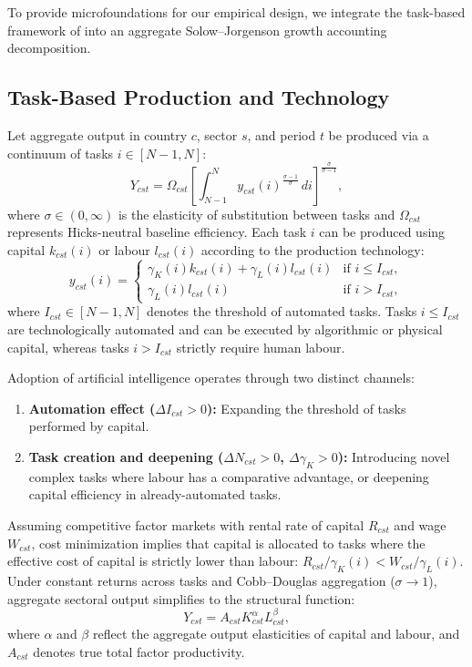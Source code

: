 \documentclass[11pt,a4paper]{article}
\begin{document}
To provide microfoundations for our empirical design, we integrate the task-based framework of \citet{acemoglu2018} into an aggregate Solow--Jorgenson growth accounting decomposition.

\subsection{Task-Based Production and Technology}
Let aggregate output in country $c$, sector $s$, and period $t$ be produced via a continuum of tasks $i \in [N-1, N]$:
\begin{equation}
    Y_{cst} = \Omega_{cst} \left[ \int_{N-1}^{N} y_{cst}(i)^{\frac{\sigma - 1}{\sigma}} \, di \right]^{\frac{\sigma}{\sigma - 1}},
    \label{eq:task_agg}
\end{equation}
where $\sigma \in (0, \infty)$ is the elasticity of substitution between tasks and $\Omega_{cst}$ represents Hicks-neutral baseline efficiency. Each task $i$ can be produced using capital $k_{cst}(i)$ or labour $l_{cst}(i)$ according to the production technology:
\begin{equation}
    y_{cst}(i) = 
    \begin{cases} 
        \gamma_K(i) k_{cst}(i) + \gamma_L(i) l_{cst}(i) & \text{if } i \le I_{cst}, \\
        \gamma_L(i) l_{cst}(i) & \text{if } i > I_{cst},
    \end{cases}
    \label{eq:task_tech}
\end{equation}
where $I_{cst} \in [N-1, N]$ denotes the threshold of automated tasks. Tasks $i \le I_{cst}$ are technologically automated and can be executed by algorithmic or physical capital, whereas tasks $i > I_{cst}$ strictly require human labour.

Adoption of artificial intelligence operates through two distinct channels:
\begin{enumerate}
    \item \textbf{Automation effect ($\Delta I_{cst} > 0$):} Expanding the threshold of tasks performed by capital.
    \item \textbf{Task creation and deepening ($\Delta N_{cst} > 0$, $\Delta \gamma_K > 0$):} Introducing novel complex tasks where labour has a comparative advantage, or deepening capital efficiency in already-automated tasks.
\end{enumerate}

Assuming competitive factor markets with rental rate of capital $R_{cst}$ and wage $W_{cst}$, cost minimization implies that capital is allocated to tasks where the effective cost of capital is strictly lower than labour: $R_{cst}/\gamma_K(i) < W_{cst}/\gamma_L(i)$. Under constant returns across tasks and Cobb--Douglas aggregation ($\sigma \to 1$), aggregate sectoral output simplifies to the structural function:
\begin{equation}
    Y_{cst} = A_{cst} K_{cst}^{\alpha} L_{cst}^{\beta},
    \label{eq:cd_structural}
\end{equation}
where $\alpha$ and $\beta$ reflect the aggregate output elasticities of capital and labour, and $A_{cst}$ denotes true total factor productivity.
\end{document}
